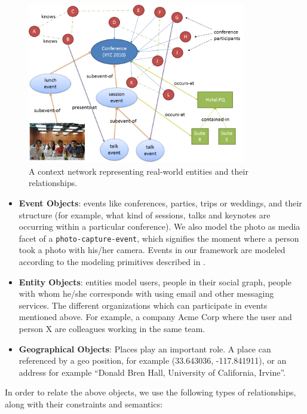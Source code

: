 \begin{figure}[h]
\centering
\includegraphics[width=0.85\textwidth]{media/chapter2/context-network-large.png}
\caption{A context network representing real-world entities and their relationships.}
\label{fig:context-network-large}
\end{figure}

\begin{itemize}
\item \textbf{Event Objects}: events like conferences, parties, trips or weddings, and their structure (for example, what kind of sessions, talks and keynotes are occurring within a particular conference). We also model the photo as media facet of a \texttt{photo-capture-event}, which signifies the moment where a person took a photo with his/her camera. Events in our framework are modeled according to the modeling primitives described in \cite{gupta2011managing, westermann2007toward}.

\item \textbf{Entity Objects}: entities model users, people in their social graph, people with whom he/she corresponds with using email and other messaging services. The different organizations which can participate in events mentioned above. For example, a company Acme Corp where the user and person X are colleagues working in the same team.

\item \textbf{Geographical Objects}: Places play an important role. A place can referenced by a geo position, for example (33.643036, -117.841911), or an address for example ``Donald Bren Hall, University of California, Irvine''. 
\end{itemize}

In order to relate the above objects, we use the following types of relationships, along with their constraints and semantics:

